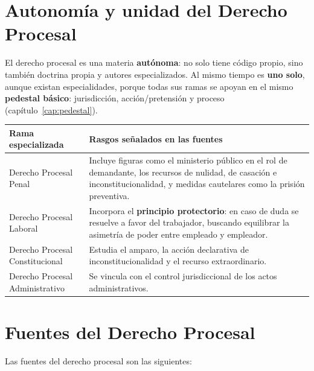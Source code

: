 \documentclass[12pt,oneside]{book}
\renewcommand{\arraystretch}{1.15}
\begin{document}
\section{Autonomía y unidad del Derecho Procesal}

El derecho procesal es una materia \textbf{autónoma}: no solo tiene código propio, sino también doctrina propia y autores especializados. Al mismo tiempo es \textbf{uno solo}, aunque existan especialidades, porque todas sus ramas se apoyan en el mismo \textbf{pedestal básico}: jurisdicción, acción/pretensión y proceso (capítulo~\ref{cap:pedestal}).

\begin{table}[H]
\centering
\renewcommand{\arraystretch}{1.25}
\begin{tabularx}{\textwidth}{>{\RaggedRight\arraybackslash}p{}>{\RaggedRight\arraybackslash}X}
\toprule
\textbf{Rama especializada} & \textbf{Rasgos señalados en las fuentes} \\
\midrule
Derecho Procesal Penal & Incluye figuras como el ministerio público en el rol de demandante, los recursos de nulidad, de casación e inconstitucionalidad, y medidas cautelares como la prisión preventiva. \\
\addlinespace
Derecho Procesal Laboral & Incorpora el \textbf{principio protectorio}: en caso de duda se resuelve a favor del trabajador, buscando equilibrar la asimetría de poder entre empleado y empleador. \\
\addlinespace
Derecho Procesal Constitucional & Estudia el amparo, la acción declarativa de inconstitucionalidad y el recurso extraordinario. \\
\addlinespace
Derecho Procesal Administrativo & Se vincula con el control jurisdiccional de los actos administrativos. \\
\bottomrule
\end{tabularx}
\end{table}

\section{Fuentes del Derecho Procesal}

Las fuentes del derecho procesal son las siguientes:
\end{document}
